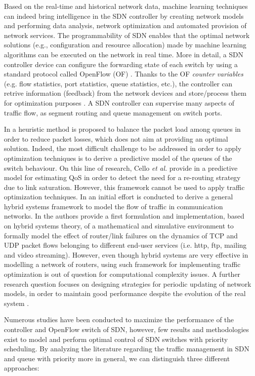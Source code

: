 Based on the real-time and historical network data, machine learning techniques can indeed bring intelligence in the SDN controller by creating network models and performing data analysis, network optimization and automated provision of network services. The programmability of SDN enables that the optimal network solutions (e.g., configuration and resource allocation) made by machine learning algorithms can be executed on the network in real time. More in detail, a SDN controller device can configure the forwarding state of each switch by using a standard protocol called OpenFlow (OF) \cite{McKeown2008}. Thanks to the OF \textit{counter variables} (e.g. flow statistics, port statistics, queue statistics, etc.), the controller can retrive information (feedback) from the network devices and store/process them for optimization purposes \cite{OFP13}. A SDN controller can supervise many aspects of traffic flow, as segment routing and queue management on switch ports. 

In \cite{Boero2016} a heuristic method is proposed to balance the packet load among queues in order to reduce packet losses, which does not aim at providing an optimal solution. Indeed, the most difficult challenge to be addressed in order to apply optimization techniques is to derive a predictive model of the queues of the switch behaviour. On this line of research, Cello \textit{et al.} provide in \cite{Cello2016} a predictive model for estimating QoS in order to detect the need for a re-routing strategy due to link saturation. However, this framework cannot be used to apply traffic optimization techniques. In \cite{LeeIEEEToN2007} an initial effort is conducted to derive a general hybrid systems framework to model the flow of traffic in communication networks. In \cite{DiBenedetto2014} the authors provide a first formulation and implementation, based on hybrid systems theory, of a mathematical and simulative environment to formally model the effect of router/link failures on the dynamics of TCP and UDP packet flows belonging to different end-user services (i.e. http, ftp, mailing and video streaming). However, even though hybrid systems are very effective in modelling a network of routers, using such framework for implementing traffic optimization is out of question for computational complexity issues. A further research question focuses on designing strategies for periodic updating of network models, in order to maintain good performance despite the evolution of the real system \cite{Mulinka2018}.

Numerous studies have been conducted to maximize the performance of the controller and OpenFlow switch of SDN, however, few results and methodologies exist to model and perform optimal control of SDN switches with priority scheduling. By analyzing the literature regarding the traffic management in SDN and queue with priority more in general, we can distinguish three different approaches:

